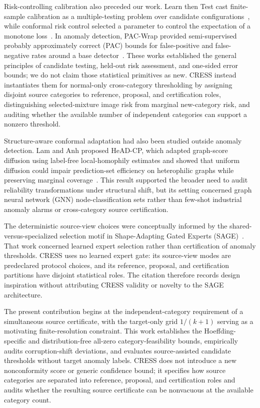 Risk-controlling calibration also preceded our work. Learn then Test cast finite-sample calibration as a multiple-testing problem over candidate configurations~\cite{angelopoulos2021learntest}, while conformal risk control selected a parameter to control the expectation of a monotone loss~\cite{angelopoulos2024crc}. In anomaly detection, PAC-Wrap provided semi-supervised probably approximately correct (PAC) bounds for false-positive and false-negative rates around a base detector~\cite{li2022pacwrap}. These works established the general principles of candidate testing, held-out risk assessment, and one-sided error bounds; we do not claim those statistical primitives as new. CRESS instead instantiates them for normal-only cross-category thresholding by assigning disjoint source categories to reference, proposal, and certification roles, distinguishing selected-mixture image risk from marginal new-category risk, and auditing whether the available number of independent categories can support a nonzero threshold.

Structure-aware conformal adaptation had also been studied outside anomaly detection. Lam and Anh proposed HeAD-CP, which adapted graph-score diffusion using label-free local-homophily estimates and showed that uniform diffusion could impair prediction-set efficiency on heterophilic graphs while preserving marginal coverage~\cite{lam2026headcp}. This result supported the broader need to audit reliability transformations under structural shift, but its setting concerned graph neural network (GNN) node-classification sets rather than few-shot industrial anomaly alarms or cross-category source certification.

The deterministic source-view choices were conceptually informed by the shared-versus-specialized selection motif in Shape-Adapting Gated Experts (SAGE)~\cite{Thai_2026_CVPR}. That work concerned learned expert selection rather than certification of anomaly thresholds. CRESS uses no learned expert gate: its source-view modes are predeclared protocol choices, and its reference, proposal, and certification partitions have disjoint statistical roles. The citation therefore records design inspiration without attributing CRESS validity or novelty to the SAGE architecture.

The present contribution begins at the independent-category requirement of a simultaneous source certificate, with the target-only grid $1/(k{+}1)$ serving as a motivating finite-resolution constraint. This work establishes the Hoeffding-specific and distribution-free all-zero category-feasibility bounds, empirically audits corruption-shift deviations, and evaluates source-assisted candidate thresholds without target anomaly labels. CRESS does not introduce a new nonconformity score or generic confidence bound; it specifies how source categories are separated into reference, proposal, and certification roles and audits whether the resulting source certificate can be nonvacuous at the available category count.
